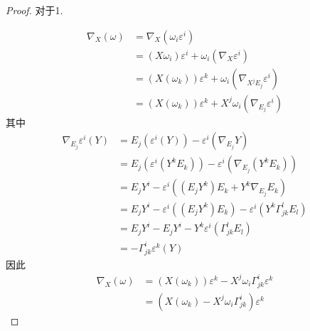 \documentclass[../../几何与拓扑.tex]{subfiles}
\begin{document}
\begin{proof}
    对于1.

    \[
    \begin{aligned}
     \nabla _{X}\left(  \omega  \right)&=   \nabla _{X} \left(  \omega _i \varepsilon ^{i} \right)   \\ 
      & = \left( X \omega _i  \right)\varepsilon ^{i} +   \omega _i \left(  \nabla _{X}\varepsilon ^{i} \right)  \\ 
       & =  \left( X\left(  \omega _k  \right)  \right)\varepsilon ^{k}+   \omega _i  \left(  \nabla _{X^{j}E_{j}}\varepsilon ^{i} \right)\\ 
        & =  \left( X\left(  \omega _k  \right)  \right)\varepsilon ^{k} +   X^{j}\omega _i \left(  \nabla _{E_{j}}\varepsilon ^{i} \right)   
    \end{aligned}
    \]其中 \[
    \begin{aligned}
     \nabla _{E_{j}}\varepsilon ^{i} \left( Y \right) & =  E_{j}\left( \varepsilon ^{i}\left( Y \right)  \right) -\varepsilon ^{i}\left(  \nabla _{E_{j}}Y \right)    \\ 
      & =  E_{j}\left( \varepsilon ^{i}\left( Y^{k}E_{k} \right)  \right)-\varepsilon ^{i}\left(  \nabla _{E_{j}} \left( Y^{k}E_{k} \right)  \right)\\ 
       & =    E_{j}Y^{i}-\varepsilon ^{i} \left( \left( E_{j}Y^{k} \right)E_{k}+ Y^{k}  \nabla _{E_{j}}E_{k}  \right)\\ 
        & = E_{j}Y^{i}- \varepsilon ^{i} \left( \left( E_{j}Y^{k} \right) E_{k} \right) - \varepsilon ^{i} \left( Y^{k}  \Gamma _{jk}^{l}E_{l} \right)   \\ 
         & =  E_{j}Y^{i}-E_{j}Y^{i}- Y^{k} \varepsilon ^{i} \left(  \Gamma _{jk}^{l}E_{l} \right)  \\ 
          & =  - \Gamma _{jk}^{i}\varepsilon ^{k} \left( Y \right) 
    \end{aligned}
    \]因此 \[
    \begin{aligned}
        \nabla _{X}\left(  \omega  \right)& =  \left( X\left(  \omega _k  \right)  \right)\varepsilon ^{k} - X^{j} \omega _i    \Gamma _{jk}^{i} \varepsilon ^{k}\\ 
      & =   \left( X\left(  \omega _k  \right)-X^{j} \omega _i    \Gamma _{jk}^{i}\right)\varepsilon ^{k} 
    \end{aligned}
    \]


\end{proof}
\end{document}
